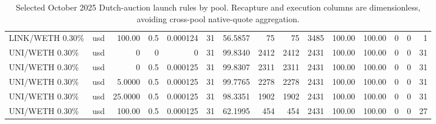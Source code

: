\begin{table}[t]
{\begin{tabular}{@{}lrrrrrrrrrrrrrr@{}}
LINK/WETH 0.30\% & usd & 100.00 & 0.5 & 0.000124 & 31 & 56.5857 & 75 & 75 & 3485 & 100.00 & 100.00 & 0 & 0 & 1 \\
UNI/WETH 0.30\% & usd & 0 & 0 & 0 & 31 & 99.8340 & 2412 & 2412 & 2431 & 100.00 & 100.00 & 0 & 0 & 31 \\
UNI/WETH 0.30\% & usd & 0 & 0.5 & 0.000125 & 31 & 99.8307 & 2311 & 2311 & 2431 & 100.00 & 100.00 & 0 & 0 & 31 \\
UNI/WETH 0.30\% & usd & 5.0000 & 0.5 & 0.000125 & 31 & 99.7765 & 2278 & 2278 & 2431 & 100.00 & 100.00 & 0 & 0 & 31 \\
UNI/WETH 0.30\% & usd & 25.0000 & 0.5 & 0.000125 & 31 & 98.3351 & 1902 & 1902 & 2431 & 100.00 & 100.00 & 0 & 0 & 31 \\
UNI/WETH 0.30\% & usd & 100.00 & 0.5 & 0.000125 & 31 & 62.1995 & 454 & 454 & 2431 & 100.00 & 100.00 & 0 & 0 & 27 \\
\bottomrule
\end{tabular}}
\caption{Selected October 2025 Dutch-auction launch rules by pool. Recapture and execution columns are dimensionless, avoiding cross-pool native-quote aggregation.}
\label{tab:month-launch-policy-by-pool}
\end{table}
